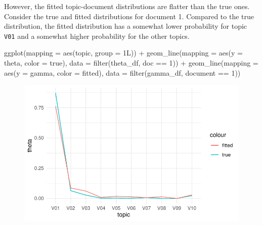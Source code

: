 \documentclass[
]{article}
\newenvironment{Shaded}{\begin{snugshade}}{\end{snugshade}}
\newcommand{\AttributeTok}[1]{\textcolor[rgb]{0.40,0.45,0.13}{#1}}
\newcommand{\FunctionTok}[1]{\textcolor[rgb]{0.28,0.35,0.67}{#1}}
\newcommand{\NormalTok}[1]{\textcolor[rgb]{0.00,0.23,0.31}{#1}}
\newcommand{\SpecialCharTok}[1]{\textcolor[rgb]{0.37,0.37,0.37}{#1}}
\newcommand{\StringTok}[1]{\textcolor[rgb]{0.13,0.47,0.30}{#1}}
\begin{document}
However, the fitted topic-document distributions are flatter than the
true ones. Consider the true and fitted distributions for document 1.
Compared to the true distribution, the fitted distribution has a
somewhat lower probability for topic \texttt{V01} and a somewhat higher
probability for the other topics.

\begin{Shaded}
\begin{Highlighting}[]
\FunctionTok{ggplot}\NormalTok{(}\AttributeTok{mapping =} \FunctionTok{aes}\NormalTok{(topic, }\AttributeTok{group =}\NormalTok{ 1L)) }\SpecialCharTok{+}
    \FunctionTok{geom\_line}\NormalTok{(}\AttributeTok{mapping =} \FunctionTok{aes}\NormalTok{(}\AttributeTok{y =}\NormalTok{ theta, }\AttributeTok{color =} \StringTok{\textquotesingle{}true\textquotesingle{}}\NormalTok{), }
              \AttributeTok{data =} \FunctionTok{filter}\NormalTok{(theta\_df, doc }\SpecialCharTok{==} \StringTok{\textquotesingle{}1\textquotesingle{}}\NormalTok{)) }\SpecialCharTok{+}
    \FunctionTok{geom\_line}\NormalTok{(}\AttributeTok{mapping =} \FunctionTok{aes}\NormalTok{(}\AttributeTok{y =}\NormalTok{ gamma, }\AttributeTok{color =} \StringTok{\textquotesingle{}fitted\textquotesingle{}}\NormalTok{), }
              \AttributeTok{data =} \FunctionTok{filter}\NormalTok{(gamma\_df, document }\SpecialCharTok{==} \StringTok{\textquotesingle{}1\textquotesingle{}}\NormalTok{))}
\end{Highlighting}
\end{Shaded}

\begin{figure}[H]

{\centering \includegraphics{paper_files/figure-pdf/unnamed-chunk-21-1.pdf}

}

\end{figure}
\end{document}

